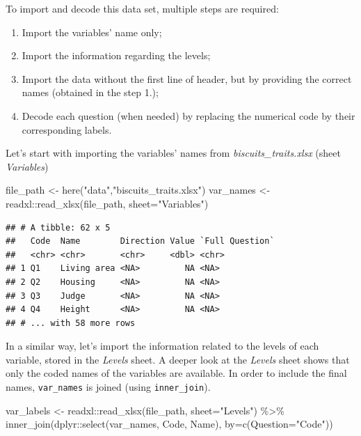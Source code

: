 \documentclass[
]{krantz}
\makeatletter
\newenvironment{Shaded}{\begin{snugshade}}{\end{snugshade}}
\newcommand{\AttributeTok}[1]{\textcolor[rgb]{0.61,0.61,0.61}{#1}}
\newcommand{\FunctionTok}[1]{\textcolor[rgb]{0,0,0}{#1}}
\newcommand{\NormalTok}[1]{#1}
\newcommand{\OtherTok}[1]{\textcolor[rgb]{0.37,0.37,0.37}{#1}}
\newcommand{\SpecialCharTok}[1]{\textcolor[rgb]{0,0,0}{#1}}
\newcommand{\StringTok}[1]{\textcolor[rgb]{0.5,0.5,0.5}{#1}}
\providecommand{\tightlist}{%
  \setlength{\itemsep}{0pt}\setlength{\parskip}{0pt}}
\newenvironment{kframe}{%
\medskip{}
\setlength{\fboxsep}{.8em}
 \def\at@end@of@kframe{}%
 \ifinner\ifhmode%
  \def\at@end@of@kframe{\end{minipage}}%
  \begin{minipage}{\columnwidth}%
 \fi\fi%
 \def\FrameCommand##1{\hskip\@totalleftmargin \hskip-\fboxsep
 \colorbox{shadecolor}{##1}\hskip-\fboxsep
     \hskip-\linewidth \hskip-\@totalleftmargin \hskip\columnwidth}%
 \MakeFramed {\advance\hsize-\width
   \@totalleftmargin\z@ \linewidth\hsize
   \@setminipage}}%
 {\par\unskip\endMakeFramed%
 \at@end@of@kframe}
\renewenvironment{Shaded}{\begin{kframe}}{\end{kframe}}
\makeatother
\begin{document}
To import and decode this data set, multiple steps are required:

\begin{enumerate}
\def\labelenumi{\arabic{enumi}.}
\tightlist
\item
  Import the variables' name only;
\item
  Import the information regarding the levels;
\item
  Import the data without the first line of header, but by providing the correct names (obtained in the step 1.);
\item
  Decode each question (when needed) by replacing the numerical code by their corresponding labels.
\end{enumerate}

Let's start with importing the variables' names from \emph{biscuits\_traits.xlsx} (sheet \emph{Variables})

\begin{Shaded}
\begin{Highlighting}[]
\NormalTok{file\_path }\OtherTok{\textless{}{-}} \FunctionTok{here}\NormalTok{(}\StringTok{"data"}\NormalTok{,}\StringTok{"biscuits\_traits.xlsx"}\NormalTok{) }
\NormalTok{var\_names }\OtherTok{\textless{}{-}}\NormalTok{ readxl}\SpecialCharTok{::}\FunctionTok{read\_xlsx}\NormalTok{(file\_path, }\AttributeTok{sheet=}\StringTok{"Variables"}\NormalTok{)}
\end{Highlighting}
\end{Shaded}

\begin{verbatim}
## # A tibble: 62 x 5
##   Code  Name        Direction Value `Full Question`
##   <chr> <chr>       <chr>     <dbl> <chr>          
## 1 Q1    Living area <NA>         NA <NA>           
## 2 Q2    Housing     <NA>         NA <NA>           
## 3 Q3    Judge       <NA>         NA <NA>           
## 4 Q4    Height      <NA>         NA <NA>           
## # ... with 58 more rows
\end{verbatim}

In a similar way, let's import the information related to the levels of each variable, stored in the \emph{Levels} sheet.
A deeper look at the \emph{Levels} sheet shows that only the coded names of the variables are available. In order to include the final names, \texttt{var\_names} is joined (using \texttt{inner\_join}).

\begin{Shaded}
\begin{Highlighting}[]
\NormalTok{var\_labels }\OtherTok{\textless{}{-}}\NormalTok{ readxl}\SpecialCharTok{::}\FunctionTok{read\_xlsx}\NormalTok{(file\_path, }\AttributeTok{sheet=}\StringTok{"Levels"}\NormalTok{) }\SpecialCharTok{\%\textgreater{}\%} 
  \FunctionTok{inner\_join}\NormalTok{(dplyr}\SpecialCharTok{::}\FunctionTok{select}\NormalTok{(var\_names, Code, Name), }\AttributeTok{by=}\FunctionTok{c}\NormalTok{(}\AttributeTok{Question=}\StringTok{"Code"}\NormalTok{))}
\end{Highlighting}
\end{Shaded}
\end{document}
